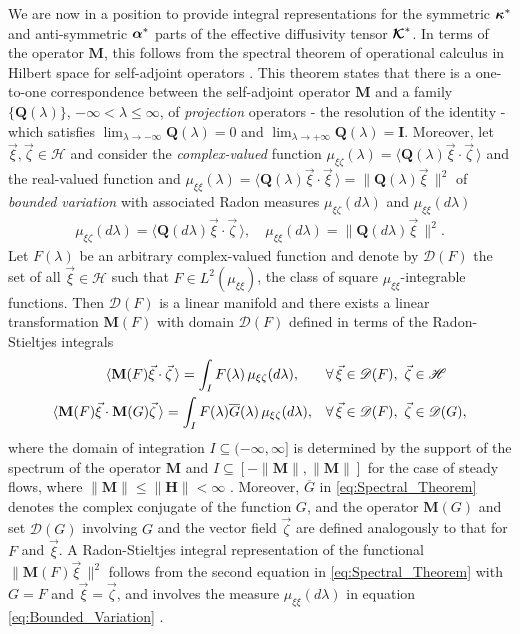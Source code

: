 \documentclass[11pt]{amsart}
\newcommand{\Mb}{\mathbf{M}}
\newcommand{\Hb}{\mathbf{H}}
\newcommand{\Ib}{\mathbf{I}}
\newcommand{\Qb}{\mathbf{Q}}
\newcommand\Kbc{\mbox{\boldmath${\mathcal{K}}$}}
\newcommand{\Hs}{\mathscr{H}}
\newcommand\balpha{\mbox{\boldmath${\alpha}$}}
\newcommand\bkappa{\mbox{\boldmath${\kappa}$}}
\begin{document}
We are now in a position to provide integral representations for the 
symmetric $\bkappa^*$ and anti-symmetric $\balpha^*$ parts of the
effective diffusivity tensor $\Kbc^*$. In terms of the operator $\Mb$,
this follows from the spectral theorem of operational calculus in
Hilbert space for self-adjoint operators
\cite{Reed-1980,Stone:64}. This theorem states that there is a
one-to-one correspondence between the self-adjoint operator $\Mb$ and
a family $\{\Qb(\lambda)\}$, $-\infty<\lambda\leq\infty$, of \emph{projection} operators - the
resolution of the identity - which satisfies $\lim_{\lambda\to-\infty}\Qb(\lambda)=0$ and
$\lim_{\lambda\to+\infty}\Qb(\lambda)=\Ib$. Moreover, let $\vec{\xi},\vec{\zeta}\in\Hs$ and
consider the \emph{complex-valued} function
$\mu_{\xi\zeta}(\lambda)=\langle\Qb(\lambda)\vec{\xi}\cdot\vec{\zeta}\,\rangle$  and the real-valued function 
and $\mu_{\xi\xi}(\lambda)=\langle\Qb(\lambda)\vec{\xi}\cdot\vec{\xi}\,\rangle=\|\Qb(\lambda)\vec{\xi}\,\|^2$ of 
\emph{bounded variation} with associated Radon
measures $\mu_{\xi\zeta}(d\lambda)$ and $\mu_{\xi\xi}(d\lambda)$ \cite{Stone:64}
%
\begin{align}\label{eq:Bounded_Variation}
  \mu_{\xi\zeta}(d\lambda)=\langle\Qb(d\lambda)\vec{\xi}\cdot\vec{\zeta}\,\rangle, \quad
  \mu_{\xi\xi}(d\lambda)=\|\Qb(d\lambda)\vec{\xi}\,\|^2.
\end{align}
%
Let $F(\lambda)$ be an arbitrary complex-valued function and denote by
$\mathscr{D}(F)$ the set of all $\vec{\xi}\in\Hs$ such that
$F\in L^2(\mu_{\xi\xi})$, the class of square $\mu_{\xi\xi}$-integrable
functions. Then $\mathscr{D}(F)$ is a linear manifold and there exists
a linear transformation $\Mb(F)$ with domain $\mathscr{D}(F)$ defined
in terms of the Radon-Stieltjes integrals \cite{Stone:64}
%
\begin{align}\label{eq:Spectral_Theorem}
  \langle\Mb(F)\vec{\xi}\cdot\vec{\zeta}\,\rangle=\int_IF(\lambda)\,\mu_{\xi\zeta}(d\lambda), \qquad
  &\forall \, \vec{\xi}\in\mathscr{D}(F), \ \vec{\zeta}\in\Hs
  \\
  \langle\Mb(F)\vec{\xi}\cdot\Mb(G)\vec{\zeta}\,\rangle=\int_IF(\lambda)\overline{G}(\lambda)\,\mu_{\xi\zeta}(d\lambda),
  \quad
  &\forall \, \vec{\xi}\in\mathscr{D}(F), \ \vec{\zeta}\in\mathscr{D}(G),
  \notag
\end{align}
%
where the domain of integration $I\subseteq(-\infty,\infty]$ is determined by the
support of the spectrum of the operator $\Mb$ and $I\subseteq[-\|\Mb\|,\|\Mb\|]$
for the case of steady flows, where $\|\Mb\|\leq\|\Hb\|<\infty$
\cite{Reed-1980}. Moreover, $\overline{G}$ in
\eqref{eq:Spectral_Theorem} denotes the complex conjugate of the
function $G$, and the operator $\Mb(G)$ and set $\mathscr{D}(G)$
involving $G$ and the vector field $\vec{\zeta}$ are defined analogously
to that for $F$ and $\vec{\xi}$. A Radon-Stieltjes integral
representation of the functional $\|\Mb(F)\vec{\xi}\,\|^2$ follows from
the second equation in \eqref{eq:Spectral_Theorem} with $G=F$ and
$\vec{\xi}=\vec{\zeta}$, and involves the measure $\mu_{\xi\xi}(d\lambda)$ in equation
\eqref{eq:Bounded_Variation} \cite{Stone:64}. 
\end{document}
